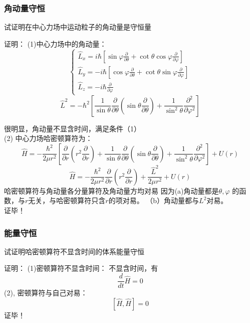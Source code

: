 \begin{frame} [allowframebreaks=]
    \frametitle{角动量守恒} 
    \begin{tcolorbox}[colback=yellow!5,colframe=yellow!75!black,title=动量守恒：]
        试证明在中心力场中运动粒子的角动量是守恒量                                
    \end{tcolorbox}
    \alert{证明：} (1)中心力场中的角动量：
    $$
    \left\{\begin{array}{l}
        \hat{L}_{x}=i \hbar\left[\sin \varphi \frac{\partial}{\partial \theta}+\cot \theta \cos \varphi \frac{\partial}{\partial \varphi}\right] \\
        \hat{L}_{y}=-i \hbar\left[\cos \varphi \frac{\partial}{\partial \theta}+\cot \theta \sin \varphi \frac{\partial}{\partial \varphi}\right] \\
        \hat{L}_{z}=-i \hbar \frac{\partial}{\partial \varphi}
        \end{array}\right.
    $$
    $$ \hat{L}^{2}=-\hbar^{2}\left[\frac{1}{\sin \theta} \frac{\partial}{\partial \theta}\left(\sin \theta \frac{\partial}{\partial \theta}\right)+\frac{1}{\sin ^{2} \theta} \frac{\partial^{2}}{\partial \varphi^{2}}\right] $$
    
    很明显，角动量不显含时间，满足条件（1）\\
    (2) 中心力场哈密顿算符为： 
    $$
    \hat{H}=-\frac{\hbar^{2}}{2 \mu r^{2}}\left[\frac{\partial}{\partial r}\left(r^{2} \frac{\partial}{\partial r}\right)+\frac{1}{\sin \theta} \frac{\partial}{\partial \theta}\left(\sin \theta \frac{\partial}{\partial \theta}\right)+\frac{1}{\sin ^{2} \theta} \frac{\partial^{2}}{\partial \varphi^{2}}\right]+U(r)
    $$
    $$
    \hat{H}=-\frac{\hbar^{2}}{2 \mu r^{2}} \frac{\partial}{\partial r}\left(r^{2} \frac{\partial}{\partial r}\right)+\frac{\hat{L}^{2}}{2 \mu r^{2}}+U(r)
    $$
    哈密顿算符与角动量各分量算符及角动量方均对易 因为(a)角动量都是$\theta, \varphi$ 的函数，与$r$无关，与哈密顿算符只含$r$的项对易。
    （b）角动量都与$L^2$对易。\\
    证毕！
\end{frame}

\begin{frame} [allowframebreaks=]
    \frametitle{能量守恒} 
    \begin{tcolorbox}[colback=yellow!5,colframe=yellow!75!black,title=能量守恒：]
        试证明哈密顿算符不显含时间的体系能量守恒                               
    \end{tcolorbox}
    \alert{证明：} (1)密顿算符不显含时间：
    不显含时间，有 $$\frac{d}{dt}\hat{H}=0$$ 
    (2), 密顿算符与自己对易： 
        $$ [\hat{H},\hat{H}]=0 $$
    证毕！
\end{frame}

